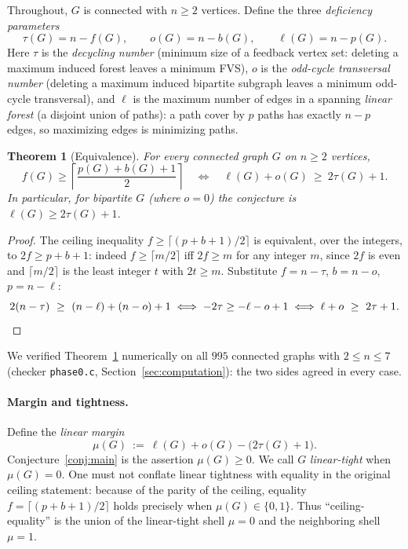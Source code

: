 \documentclass[11pt]{article}
\theoremstyle{plain}
\newtheorem{theorem}{Theorem}[section]
\theoremstyle{definition}
\newcommand{\FVS}{\tau}
\newcommand{\OCT}{o}
\newcommand{\lf}{\ell}
\begin{document}
Throughout, $G$ is connected with $n\ge2$ vertices. Define the three
\emph{deficiency parameters}
\[
\FVS(G)=n-f(G),\qquad \OCT(G)=n-b(G),\qquad \lf(G)=n-p(G).
\]
Here $\FVS$ is the \emph{decycling number} (minimum size of a feedback vertex
set: deleting a maximum induced forest leaves a minimum FVS), $\OCT$ is the
\emph{odd-cycle transversal number} (deleting a maximum induced bipartite
subgraph leaves a minimum odd-cycle transversal), and $\lf$ is the maximum number
of edges in a spanning \emph{linear forest} (a disjoint union of paths): a path
cover by $p$ paths has exactly $n-p$ edges, so maximizing edges is minimizing
paths.

\begin{theorem}[Equivalence]\label{thm:equiv}
For every connected graph $G$ on $n\ge2$ vertices,
\[
f(G)\ge\left\lceil\frac{p(G)+b(G)+1}{2}\right\rceil
\quad\Longleftrightarrow\quad
\lf(G)+\OCT(G)\ \ge\ 2\FVS(G)+1 .
\]
In particular, for bipartite $G$ (where $\OCT=0$) the conjecture is
$\lf(G)\ge2\FVS(G)+1$.
\end{theorem}

\begin{proof}
The ceiling inequality $f\ge\lceil(p+b+1)/2\rceil$ is equivalent, over the
integers, to $2f\ge p+b+1$: indeed $f\ge\lceil m/2\rceil$ iff $2f\ge m$ for any
integer $m$, since $2f$ is even and $\lceil m/2\rceil$ is the least integer $t$
with $2t\ge m$. Substitute $f=n-\FVS$, $b=n-\OCT$, $p=n-\lf$:
\[
2(n-\FVS)\ \ge\ (n-\lf)+(n-\OCT)+1
\iff -2\FVS \ge -\lf-\OCT+1
\iff \lf+\OCT\ \ge\ 2\FVS+1. \qedhere
\]
\end{proof}

We verified Theorem~\ref{thm:equiv} numerically on all $995$ connected graphs
with $2\le n\le7$ (checker \texttt{phase0.c}, Section~\ref{sec:computation}):
the two sides agreed in every case.

\paragraph{Margin and tightness.} Define the \emph{linear margin}
\[
\mu(G)\ :=\ \lf(G)+\OCT(G)-\bigl(2\FVS(G)+1\bigr).
\]
Conjecture~\ref{conj:main} is the assertion $\mu(G)\ge0$. We call $G$
\emph{linear-tight} when $\mu(G)=0$. One must not conflate linear tightness with
equality in the original ceiling statement: because of the parity of the ceiling,
equality $f=\lceil(p+b+1)/2\rceil$ holds precisely when $\mu(G)\in\{0,1\}$. Thus
``ceiling-equality'' is the union of the linear-tight shell $\mu=0$ and the
neighboring shell $\mu=1$.
\end{document}
